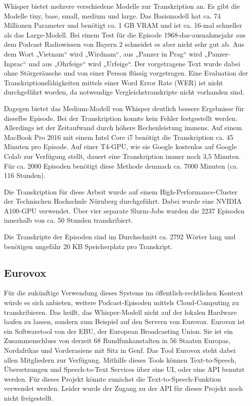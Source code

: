 Whisper bietet mehrere verschiedene Modelle zur Transkription an.
Es gibt die Modelle tiny, base, small, medium und large.
Das Basismodell hat ca. 74 Millionen Parameter und benötigt ca. 1 GB VRAM und ist ca. 16-mal schneller als das Large-Modell.
Bei einem Test für die Episode 1968-das-ausnahmejahr aus dem Podcast Radiowissen von Bayern 2 schneidet es aber nicht sehr gut ab.
Aus dem Wort „Vietnam“ wird „Wirdnam“, aus „Panzer in Prag“ wird „Panzer-Inprac“ und aus „Ohrfeige“ wird „Urfeige“.
Der vorgetragene Text wurde dabei ohne Störgeräusche und von einer Person flüssig vorgetragen.
Eine Evaluation der Transkriptionsfähigkeiten mittels einer Word Error Rate (WER) ist nicht durchgeführt worden, da notwendige Vergleichstranskripte nicht vorhanden sind.

Dagegen bietet das Medium-Modell von Whisper deutlich bessere Ergebnisse für dieselbe Episode.
Bei der Transkription konnte kein Fehler festgestellt werden.
Allerdings ist der Zeitaufwand durch höhere Rechenleistung immens.
Auf einem MacBook Pro 2016 mit einem Intel Core i7 benötigt die Transkription ca. 45 Minuten pro Episode.
Auf einer T4-GPU, wie sie Google kostenlos auf Google Colab zur Verfügung stellt, dauert eine Transkription immer noch 3,5 Minuten.
Für ca. 2000 Episoden benötigt diese Methode demnach ca. 7000 Minuten (ca. 116 Stunden).

Die Transkription für diese Arbeit wurde auf einem High-Performance-Cluster der Technischen Hochschule Nürnberg durchgeführt.
Dabei wurde eine NVIDIA A100-GPU verwendet.
Über vier separate Slurm-Jobs wurden die 2237 Episoden innerhalb von ca. 50 Stunden transkribiert.

Die Transkripte der Episoden sind im Durchschnitt ca. 2792 Wörter lang und benötigen ungefähr 20 KB Speicherplatz pro Transkript.



\subsection{Eurovox}

Für die zukünftige Verwendung dieses Systems im öffentlich-rechtlichen Kontext würde es sich anbieten, weitere Podcast-Episoden mittels Cloud-Computing zu transkribieren.
Das heißt, das Whisper-Modell nicht auf der lokalen Hardware laufen zu lassen, sondern zum Beispiel auf den Servern von Eurovox.
Eurovox ist ein Softwaretool von der EBU, der European Broadcasting Union.
Sie ist ein Zusammenschluss von derzeit 68 Rundfunkanstalten in 56 Staaten Europas, Nordafrikas und Vorderasiens mit Sitz in Genf.
Das Tool Eurovox steht dabei allen Mitgliedern zur Verfügung.
Mithilfe dieses Tools können Text-to-Speech, Übersetzungen und Speech-to-Text Services über eine UI, oder eine API benutzt werden.
Für dieses Projekt könnte zunächst die Text-to-Speech-Funktion verwendet werden.
Leider wurde der Zugang zu der API für dieses Projekt noch nicht freigestellt.~\cite{eurovox2024}


